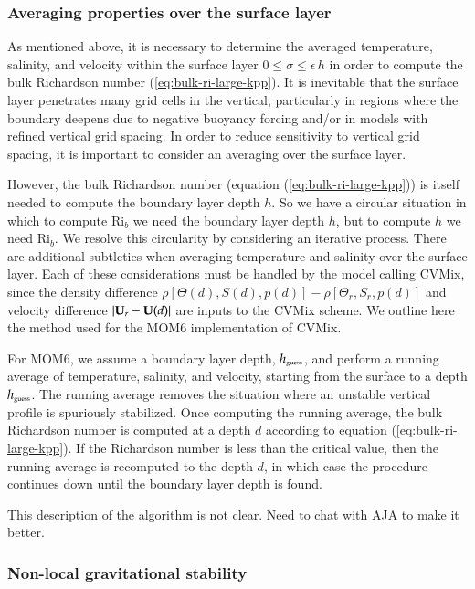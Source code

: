 \subsubsection{Averaging properties over the surface layer}

As mentioned above, it is necessary to determine the averaged
temperature, salinity, and velocity within the surface layer $0 \le
\sigma \le \epsilon \, h$ in order to compute the bulk Richardson
number (\ref{eq:bulk-ri-large-kpp}).  It is inevitable that the
surface layer penetrates many grid cells in the vertical, particularly
in regions where the boundary deepens due to negative buoyancy forcing
and/or in models with refined vertical grid spacing.  In order to
reduce sensitivity to vertical grid spacing, it is important to
consider an averaging over the surface layer.

However, the bulk Richardson number (equation
(\ref{eq:bulk-ri-large-kpp})) is itself needed to compute the boundary
layer depth $h$.  So we have a circular situation in which to compute
$\mbox{Ri}_{b}$ we need the boundary layer depth $h$, but to compute
$h$ we need $\mbox{Ri}_{b}$.  We resolve this circularity by
considering an iterative process.  There are additional subtleties
when averaging temperature and salinity over the surface layer.  Each
of these considerations must be handled by the model calling CVMix,
since the density difference $\rho[\Theta(d), S(d), p(d)] -
\rho[\Theta_{r}, S_{r}, p(d)]$ and velocity difference $|{\bf U}_{r} -
{\bf U}(d)|$ are inputs to the CVMix scheme.  We outline here the
method used for the MOM6 implementation of CVMix.

For MOM6, we assume a boundary layer depth, $h_{\mbox{\tiny guess}}$,
and perform a running average of temperature, salinity, and velocity,
starting from the surface to a depth $h_{\mbox{\tiny guess}}$.  The
running average removes the situation where an unstable vertical
profile is spuriously stabilized.  Once computing the running average,
the bulk Richardson number is computed at a depth $d$ according to
equation (\ref{eq:bulk-ri-large-kpp}).  If the Richardson number is
less than the critical value, then the running average is recomputed
to the depth $d$, in which case the procedure continues down until the
boundary layer depth is found.

\color{red} This description of the algorithm is not clear.  Need to
chat with AJA to make it better.  \color{black}




\subsubsection{Non-local gravitational stability}

